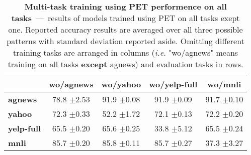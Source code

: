 \begin{table}[h]
	\fontsize{7}{10}
	\selectfont
	\begin{tabular}{lcccc}
		\toprule
		& \textbf{wo/agnews} & \textbf{wo/yahoo} & \textbf{wo/yelp-full} & \textbf{wo/mnli} \\
		\hline
		\textbf{agnews}    & 78.8 \tiny$\pm$2.53        & 91.9 \tiny$\pm$0.08        & 91.9   \tiny$\pm$0.09          & 91.7 \tiny$\pm$0.10       \\
		\textbf{yahoo}     & 72.3 \tiny$\pm$0.33        & 52.2 \tiny$\pm$1.72        & 72.1   \tiny$\pm$0.13          & 72.2 \tiny$\pm$0.20       \\
		\textbf{yelp-full} & 65.5 \tiny$\pm$0.20        & 65.6 \tiny$\pm$0.25        & 33.8   \tiny$\pm$5.12          & 65.5 \tiny$\pm$0.24       \\
		\textbf{mnli}      & 85.7 \tiny$\pm$0.20        & 85.8 \tiny$\pm$0.11        & 85.7   \tiny$\pm$0.27          & 37.3 \tiny$\pm$3.27      \\
		\bottomrule
	\end{tabular}
	\caption{\textbf{Multi-task training using PET performence on all tasks}~---~results of models trained using PET on all tasks exept one. Reported accuracy results are averaged over all three possible patterns with standard deviation reported aside. Omitting different training tasks are arranged in columns (\textit{i.e.} "wo/agnews" means training on all tasks \textbf{except} agnews) and evaluation tasks in rows.}\label{tab:multi-use-logits-summary}
\end{table}
